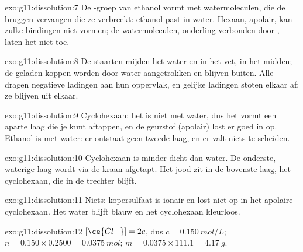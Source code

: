 \begin{solution}{exo:g11:dissolution:7}
De -groep van ethanol vormt  met watermoleculen,
die de bruggen vervangen die ze verbreekt: ethanol past in water. Hexaan,
apolair, kan zulke bindingen niet vormen; de watermoleculen, onderling
verbonden door , laten het niet toe.
\end{solution}

\begin{solution}{exo:g11:dissolution:8}
De  staarten mijden het water en  in het vet, in het
midden; de geladen koppen worden door water aangetrokken en blijven
buiten. Alle  dragen negatieve ladingen aan hun oppervlak, en
gelijke ladingen stoten elkaar af: ze blijven uit elkaar.
\end{solution}

\begin{solution}{exo:g11:dissolution:9}
Cyclohexaan: het is niet  met water, dus het vormt een aparte laag
die je kunt aftappen, en de geurstof (apolair) lost er goed in op. Ethanol
is  met water: er ontstaat geen tweede laag, en er valt niets te
scheiden.
\end{solution}

\begin{solution}{exo:g11:dissolution:10}
Cyclohexaan is minder dicht dan water. De onderste, waterige laag wordt
via de kraan afgetapt. Het jood zit in de bovenste laag, het cyclohexaan,
die in de trechter blijft.
\end{solution}

\begin{solution}{exo:g11:dissolution:11}
Niets: kopersulfaat is ionair en lost niet op in het apolaire
cyclohexaan. Het water blijft blauw en het cyclohexaan kleurloos.
\end{solution}

\begin{solution}{exo:g11:dissolution:12}
$[\ce{Cl-}] = 2c$, dus $c = \qty{0.150}{mol/L}$;
$n = 0.150 \times 0.2500 = \qty{0.0375}{mol}$;
$m = 0.0375 \times 111.1 = \qty{4.17}{g}$.
\end{solution}


